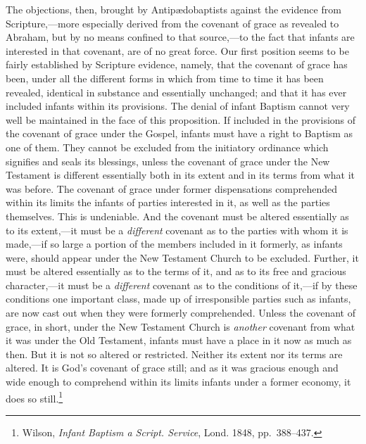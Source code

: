 \documentclass[
  english,
]{book}
\begin{document}
The objections, then, brought by Antipædobaptists against the evidence from Scripture,---more especially derived from the covenant of grace as revealed to Abraham, but by no means confined to that source,---to the fact that infants are interested in that covenant, are of no great force. Our first position seems to be fairly established by Scripture evidence, namely, that the covenant of grace has been, under all the different forms in which from time to time it has been revealed, identical in substance and essentially unchanged; and that it has ever included infants within its provisions. The denial of infant Baptism cannot very well be maintained in the face of this proposition. If included in the provisions of the covenant of grace under the Gospel, infants must have a right to Baptism as one of them. They cannot be excluded from the initiatory ordinance which signifies and seals its blessings, unless the covenant of grace under the New Testament is different essentially both in its extent and in its terms from what it was before. The covenant of grace under former dispensations comprehended within its limits the infants of parties interested in it, as well as the parties themselves. This is undeniable. And the covenant must be altered essentially as to its extent,---it must be a \emph{different} covenant as to the parties with whom it is made,---if so large a portion of the members included in it formerly, as infants were, should appear under the New Testament Church to be excluded. Further, it must be altered essentially as to the terms of it, and as to its free and gracious character,---it must be a \emph{different} covenant as to the conditions of it,---if by these conditions one important class, made up of irresponsible parties such as infants, are now cast out when they were formerly comprehended. Unless the covenant of grace, in short, under the New Testament Church is \emph{another} covenant from what it was under the Old Testament, infants must have a place in it now as much as then. But it is not so altered or restricted. Neither its extent nor its terms are altered. It is God's covenant of grace still; and as it was gracious enough and wide enough to comprehend within its limits infants under a former economy, it does so still.\footnote{Wilson, \emph{Infant Baptism a Script. Service}, Lond. 1848, pp.~388--437.}
\end{document}
